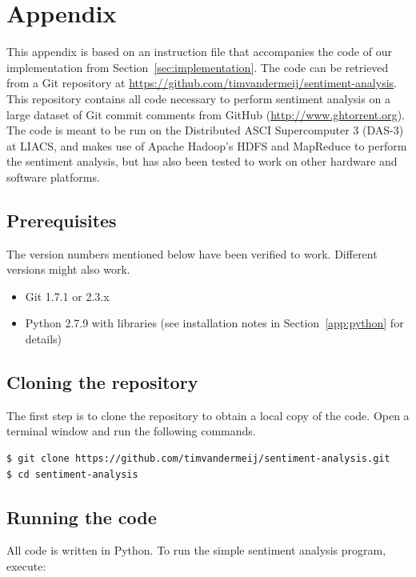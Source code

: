 \documentclass{article}
\begin{document}
\appendix
\section{Appendix}\label{app:appendix}
This appendix is based on an instruction file that accompanies the 
code of our implementation from Section~\ref{sec:implementation}. The code can 
be retrieved from a Git repository at 
\url{https://github.com/timvandermeij/sentiment-analysis}. This repository 
contains all code necessary to perform sentiment analysis on a large dataset of 
Git commit comments from GitHub (\url{http://www.ghtorrent.org}). The code is 
meant to be run on the Distributed ASCI Supercomputer 3 (DAS-3) at LIACS, and 
makes use of Apache Hadoop's HDFS and MapReduce to perform the sentiment 
analysis, but has also been tested to work on other hardware and software 
platforms.

\subsection{Prerequisites}\label{app:prerequisities}
The version numbers mentioned below have been verified to work. Different
versions might also work.

\begin{itemize}
  \item Git 1.7.1 or 2.3.x
  \item Python 2.7.9 with libraries (see installation notes in 
    Section~\ref{app:python} for details)
\end{itemize}

\subsection{Cloning the repository}\label{app:cloning-the-repository}
The first step is to clone the repository to obtain a local copy of the code. 
Open a terminal window and run the following commands.

\begin{verbatim}
$ git clone https://github.com/timvandermeij/sentiment-analysis.git
$ cd sentiment-analysis
\end{verbatim}

\subsection{Running the code}\label{app:running-the-code}
All code is written in Python. To run the simple sentiment analysis program, execute:
\end{document}
